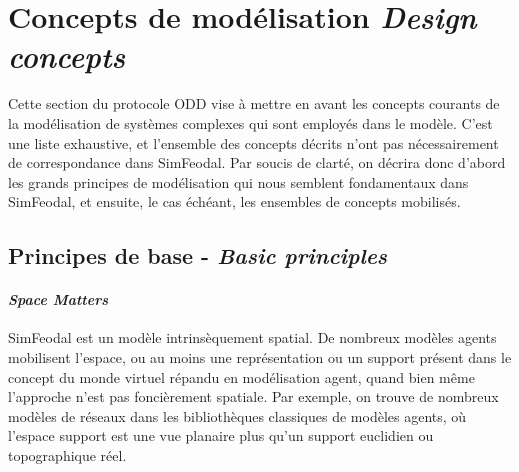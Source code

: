 
\let\orisectionmark\sectionmark
\renewcommand\sectionmark[1]{}%
\section[Concepts de modélisation-- \textit{Design concepts}]{Concepts de modélisation \protect\newline \large{\textit{Design concepts}}}
\orisectionmark{Concepts de modélisation}
\let\sectionmark\orisectionmark

Cette section du protocole ODD vise à mettre en avant les concepts courants de la modélisation de systèmes complexes qui sont employés dans le modèle.
C'est une liste exhaustive, et l'ensemble des concepts décrits n'ont pas nécessairement de correspondance dans SimFeodal.
Par soucis de clarté, on décrira donc d'abord les grands principes de modélisation qui nous semblent fondamentaux dans SimFeodal, et ensuite, le cas échéant, les ensembles de concepts mobilisés.

\subsection{Principes de base - \textit{Basic principles}}

\paragraph{\textit{Space Matters}}

SimFeodal est un modèle intrinsèquement spatial.
De nombreux modèles agents mobilisent l'espace, ou au moins une représentation ou un support présent dans le concept du \og monde\fg{} virtuel répandu en modélisation agent, quand bien même l'approche n'est pas foncièrement spatiale.
Par exemple, on trouve de nombreux modèles de réseaux dans les bibliothèques classiques de modèles agents, où l'espace support est une vue planaire plus qu'un support euclidien ou topographique réel.

